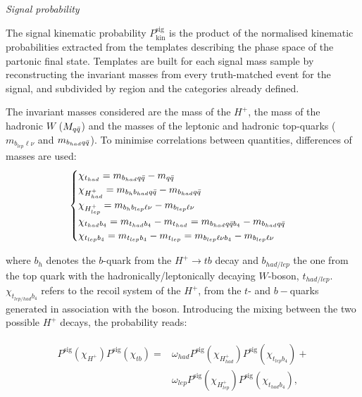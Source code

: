 \textit{Signal probability}

The signal kinematic probability $P^{\text{sig}}_{\text{kin}}$ is the product of the normalised kinematic probabilities extracted from the templates describing the phase space of the partonic final state. Templates are built for each signal mass sample by reconstructing the invariant masses from every truth-matched event for the signal, and subdivided by region and the categories already defined.

The invariant masses considered are the mass of the $H^+$, the mass of the hadronic $W$ ($M_{q\Bar{q}}$) and the masses of the leptonic and hadronic top-quarks ($m_{b_{lep}\ell\nu}$ and $m_{b_{had}q\Bar{q}}$). To minimise correlations between quantities, differences of masses are used:
\begin{equation}
    \begin{cases} \chi_{t_{had}}=m_{b_{had}q\Bar{q}}-m_{q\Bar{q}} \\ 
    \chi_{H^+_{had}}=m_{b_hb_{had}q\Bar{q}}-m_{b_{had}q\Bar{q}} \\
    \chi_{H^+_{lep}}=m_{b_hb_{lep}\ell\nu}-m_{b_{lep}\ell\nu}\\
    \chi_{t_{had}b_4}=m_{t_{had}b_4}-m_{t_{had}}=m_{b_{had}q\bar{q}b_4}-m_{b_{had}q\bar{q}}\\
    \chi_{t_{lep}b_4}=m_{t_{lep}b_4}-m_{t_{lep}}=m_{b_{lep}\ell\nu b_4}-m_{b_{lep}\ell\nu}\\
    \end{cases} 
\end{equation}

where $b_h$ denotes the $b$-quark from the $H^+\to tb$ decay and $b_{had/lep}$ the one from the top quark with the hadronically/leptonically decaying $W$-boson, $t_{had/lep}$. $\chi_{t_{lep/had}b_4}$ refers to the recoil system of the $H^+$, from the $t$- and $b-$quarks generated in association with the boson.
Introducing the mixing between the two possible $H^+$ decays, the probability reads:

\begin{align}
    \begin{split}
        P^{\text{sig}}(\chi_{H^+})P^{\text{sig}}(\chi_{tb})=&\omega_{had}P^{\text{sig}}(\chi_{H^+_{had}})P^{\text{sig}}(\chi_{t_{lep}b_4})+\\
        &\omega_{lep}P^{\text{sig}}(\chi_{H^+_{lep}})P^{\text{sig}}(\chi_{t_{had}b_4}),
    \end{split}
\end{align}

